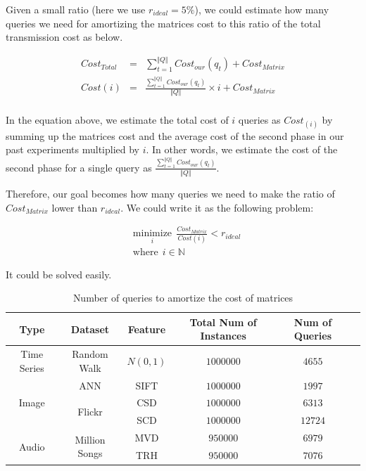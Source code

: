 Given a small ratio (here we use $r_{ideal}=5\%$), we could estimate how many queries we need for amortizing the matrices cost to this ratio of the total transmission cost as below.  

\begin{equation}
\begin{aligned}
	Cost_{Total} & = & \sum_{t=1}^{\Vert Q\Vert}{Cost_{our}(q_t)} + Cost_{Matrix} \\
	Cost(i) & = & \frac{\sum_{t=1}^{\Vert Q\Vert}{Cost_{our}(q_t)}}{{\Vert Q\Vert}}\times i + Cost_{Matrix} \\
\end{aligned}
\end{equation}

In the equation above, we estimate the total cost of $i$ queries as $Cost_(i)$ by summing up the matrices cost and the average cost of the second phase in our past experiments multiplied by $i$.  In other words, we estimate the cost of the second phase for a single query as $\frac{\sum_{t=1}^{\Vert Q\Vert}{Cost_{our}(q_t)}}{{\Vert Q\Vert}}$. 

Therefore, our goal becomes how many queries we need to make the ratio of $Cost_{Matrix}$ lower than $r_{ideal}$.  We could write it as the following problem:

\begin{equation}\label{eq:amort}
\begin{aligned}
& \underset{i}{\text{minimize}}
~~\frac{Cost_{Matrix}}{Cost(i)} < r_{ideal} \\
& \text{where}~~i \in \mathbb{N}
\end{aligned}
\end{equation}

It could be solved easily.


\begin{table}[H]\begin{center}
\caption{Number of queries to amortize the cost of matrices}\label{table:amortize}
\begin{tabular}{|c|c|c|c|c|c|}
\hline 
Type & Dataset & Feature & Total Num of Instances & Num of Queries\\ \hline \hline
Time Series & Random Walk & $N(0,1)$ & $1000000$ & $4655$\\ \hline
\multirow{3}{*}{Image} & ANN & SIFT & $1000000$ & $1997$\\ 
\cline{2-5}
 & \multirow{2}{*}{Flickr} & CSD & $1000000$ & $6313$\\ 
 \cline{3-5}
 & & SCD &  $1000000$ & $12724$\\ \hline
 \multirow{2}{*}{Audio} & \multirow{2}{*}{Million Songs} & MVD & $950000$ & $6979$\\ 
 \cline{3-5}
 & & TRH & $950000$ & $7076$\\ \hline
\end{tabular}
\end{center}\end{table}

